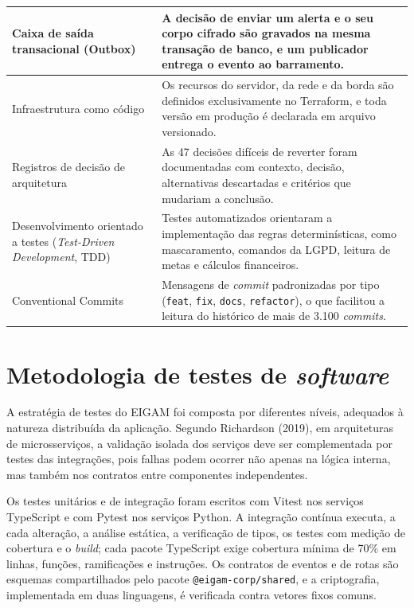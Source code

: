 {\begin{longtable}{|L{4.5cm}|L{10cm}|}
Caixa de saída transacional (Outbox) & A decisão de enviar um alerta e o seu corpo cifrado são gravados na mesma transação de banco, e um publicador entrega o evento ao barramento. \\ \hline
Infraestrutura como código & Os recursos do servidor, da rede e da borda são definidos exclusivamente no Terraform, e toda versão em produção é declarada em arquivo versionado. \\ \hline
Registros de decisão de arquitetura & As 47 decisões difíceis de reverter foram documentadas com contexto, decisão, alternativas descartadas e critérios que mudariam a conclusão. \\ \hline
Desenvolvimento orientado a testes (\textit{Test-Driven Development}, TDD) & Testes automatizados orientaram a implementação das regras determinísticas, como mascaramento, comandos da LGPD, leitura de metas e cálculos financeiros. \\ \hline
Conventional Commits & Mensagens de \textit{commit} padronizadas por tipo (\texttt{feat}, \texttt{fix}, \texttt{docs}, \texttt{refactor}), o que facilitou a leitura do histórico de mais de 3.100 \textit{commits}. \\ \hline

\end{longtable}
}

\section{Metodologia de testes de \textit{software}}

A estratégia de testes do EIGAM foi composta por diferentes níveis, adequados à natureza distribuída da aplicação. Segundo Richardson (2019), em arquiteturas de microsserviços, a validação isolada dos serviços deve ser complementada por testes das integrações, pois falhas podem ocorrer não apenas na lógica interna, mas também nos contratos entre componentes independentes.

Os testes unitários e de integração foram escritos com Vitest nos serviços TypeScript e com Pytest nos serviços Python. A integração contínua executa, a cada alteração, a análise estática, a verificação de tipos, os testes com medição de cobertura e o \textit{build}; cada pacote TypeScript exige cobertura mínima de 70\% em linhas, funções, ramificações e instruções. Os contratos de eventos e de rotas são esquemas compartilhados pelo pacote \texttt{@eigam-corp/shared}, e a criptografia, implementada em duas linguagens, é verificada contra vetores fixos comuns.

